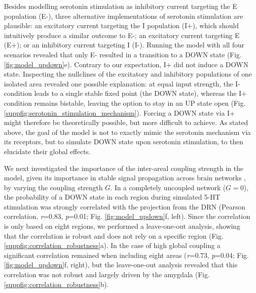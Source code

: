 \documentclass[11pt,a4paper,onecolumn]{article}
\begin{document}
Besides modelling serotonin stimulation as inhibitory current targeting the E population (E-), three alternative implementations of serotonin stimulation are plausible: an excitatory current targeting the I population (I+), which should intuitively produce a similar outcome to E-; an excitatory current targeting E (E+); or an inhibitory current targeting I (I-). Running the model with all four scenarios revealed that only E- resulted in a transition to a DOWN state (Fig. \ref{fig:model_updown}e). Contrary to our expectation, I+ did not induce a DOWN state. Inspecting the nullclines of the excitatory and inhibitory populations of one isolated area revealed one possible explanation: at equal input strength, the I- condition leads to a single stable fixed point (the DOWN state), whereas the I+ condition remains bistable, leaving the option to stay in an UP state open (Fig. \ref{suppfig:serotonin_stimulation_mechanism}). Forcing a DOWN state via I+ might therefore be theoretically possible, but more difficult to achieve. As stated above, the goal of the model is not to exactly mimic the serotonin mechanism via its receptors, but to simulate DOWN state upon serotonin stimulation, to then elucidate their global effects.

We next investigated the importance of the inter-areal coupling strength in the model, given its importance in stable signal propagation across brain networks \citep{joglekarInterarealBalancedAmplification2018}, by varying the coupling strength $G$. In a completely uncoupled network ($G=0$), the probability of a DOWN state in each region during simulated 5-HT stimulation was strongly correlated with the projection from the DRN (Pearson correlation, \emph{r}=0.83, \emph{p}=0.01; Fig. \ref{fig:model_updown}f, left). Since the correlation is only based on eight regions, we performed a leave-one-out analysis, showing that the correlation is robust and does not rely on a specific region (Fig. \ref{suppfig:correlation_robustness}a).  In the case of high global coupling a significant correlation remained when including eight areas (\emph{r}=0.73, \emph{p}=0.04; Fig. \ref{fig:model_updown}f, right), but the leave-one-out analysis revealed that this correlation was not robust and largely driven by the amygdala (Fig. \ref{suppfig:correlation_robustness}b).
\end{document}
